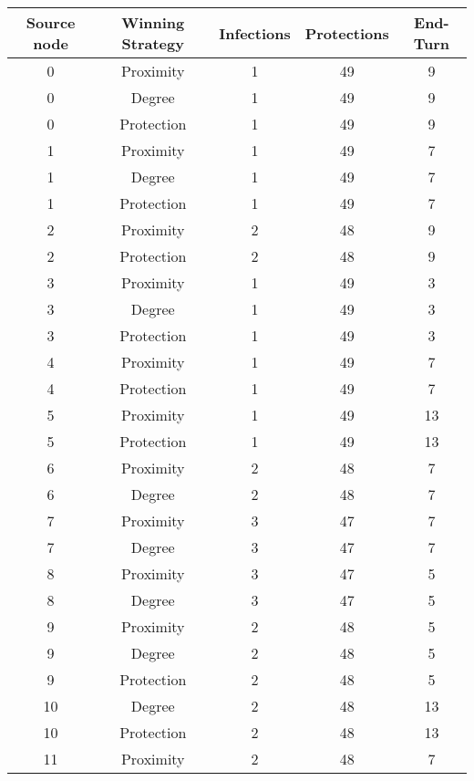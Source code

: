 \documentclass[results.tex]{subfiles}
\begin{document}
\begin{center}
  \begin{tabular}{| c || c | c | c | c |}
    \hline
    {\bfseries Source node} & {\bfseries Winning Strategy} & {\bfseries Infections} & {\bfseries Protections} & {\bfseries End-Turn} \\  %
    \hline\hline
    0 & Proximity & 1 & 49 & 9 \\ 
    \hline
    0 & Degree & 1 & 49 & 9 \\ 
    \hline
    0 & Protection & 1 & 49 & 9 \\ 
    \hline
    1 & Proximity & 1 & 49 & 7 \\ 
    \hline
    1 & Degree & 1 & 49 & 7 \\ 
    \hline
    1 & Protection & 1 & 49 & 7 \\ 
    \hline
    2 & Proximity & 2 & 48 & 9 \\ 
    \hline
    2 & Protection & 2 & 48 & 9 \\ 
    \hline
    3 & Proximity & 1 & 49 & 3 \\ 
    \hline
    3 & Degree & 1 & 49 & 3 \\ 
    \hline
    3 & Protection & 1 & 49 & 3 \\ 
    \hline
    4 & Proximity & 1 & 49 & 7 \\ 
    \hline
    4 & Protection & 1 & 49 & 7 \\ 
    \hline
    5 & Proximity & 1 & 49 & 13 \\ 
    \hline
    5 & Protection & 1 & 49 & 13 \\ 
    \hline
    6 & Proximity & 2 & 48 & 7 \\ 
    \hline
    6 & Degree & 2 & 48 & 7 \\ 
    \hline
    7 & Proximity & 3 & 47 & 7 \\ 
    \hline
    7 & Degree & 3 & 47 & 7 \\ 
    \hline
    8 & Proximity & 3 & 47 & 5 \\ 
    \hline
    8 & Degree & 3 & 47 & 5 \\ 
    \hline
    9 & Proximity & 2 & 48 & 5 \\ 
    \hline
    9 & Degree & 2 & 48 & 5 \\ 
    \hline
    9 & Protection & 2 & 48 & 5 \\ 
    \hline
    10 & Degree & 2 & 48 & 13 \\ 
    \hline
    10 & Protection & 2 & 48 & 13 \\ 
    \hline
    11 & Proximity & 2 & 48 & 7 \\ 

\end{tabular}
\end{center}
\end{document}
